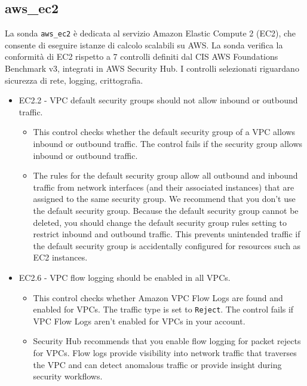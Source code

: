 \subsection{aws\_ec2}
\label{sec:ec2}

La sonda \texttt{aws\_ec2} è dedicata al servizio Amazon Elastic Compute 2 (EC2), che consente di eseguire istanze di calcolo scalabili su AWS. La sonda verifica la conformità di EC2 rispetto a 7 controlli definiti dal CIS AWS Foundations Benchmark v3, integrati in AWS Security Hub. I controlli selezionati riguardano sicurezza di rete, logging, crittografia. 

\begin{mdframed}[backgroundcolor=gray!05, linecolor=gray!50]
\itshape
\begin{itemize}
    \item EC2.2 - VPC default security groups should not allow inbound or outbound traffic.
    \begin{itemize}
        \item This control checks whether the default security group of a VPC allows inbound or outbound traffic. The control fails if the security group allows inbound or outbound traffic.
        \item The rules for the default security group allow all outbound and inbound traffic from network interfaces (and their associated instances) that are assigned to the same security group. We recommend that you don't use the default security group. Because the default security group cannot be deleted, you should change the default security group rules setting to restrict inbound and outbound traffic. This prevents unintended traffic if the default security group is accidentally configured for resources such as EC2 instances.
    \end{itemize}
    \item EC2.6 - VPC flow logging should be enabled in all VPCs.
    \begin{itemize}
        \item This control checks whether Amazon VPC Flow Logs are found and enabled for VPCs. The traffic type is set to \texttt{Reject}. The control fails if VPC Flow Logs aren't enabled for VPCs in your account.
        \item Security Hub recommends that you enable flow logging for packet rejects for VPCs. Flow logs provide visibility into network traffic that traverses the VPC and can detect anomalous traffic or provide insight during security workflows.
    \end{itemize}

\end{itemize}
\end{mdframed}
